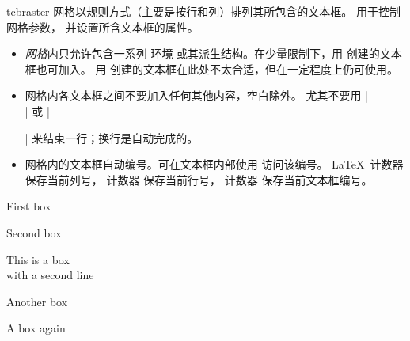 \begin{docEnvironment}[doc new and updated={2014-11-10}{2017-02-01}]{tcbraster}{}
网格以规则方式（主要是按行和列）排列其所包含的文本框。
 用于控制网格参数，
并设置所含文本框的属性。
\begin{itemize}
\item \emph{网格}内只允许包含一系列  环境
  或其派生结构。在少量限制下，用  创建的文本框也可加入。
  用  创建的文本框在此处不太合适，但在一定程度上仍可使用。
\item 网格内各文本框之间不要加入任何其他内容，空白除外。
  尤其不要用 |\\| 或 |\par| 来结束一行；换行是自动完成的。
\item 网格内的文本框自动编号。可在文本框内部使用
   访问该编号。
  \LaTeX\ 计数器  保存当前列号，
  计数器  保存当前行号，
  计数器  保存当前文本框编号。
\end{itemize}

\enlargethispage*{1cm}

\begin{dispExample}
\begin{tcbraster}[raster columns=3, raster equal height,
  size=small,colframe=red!50!black,colback=red!10!white,colbacktitle=red!50!white,
  title={Box \# \thetcbrasternum}]
  \begin{tcolorbox}First box\end{tcolorbox}
  \begin{tcolorbox}Second box\end{tcolorbox}
  \begin{tcolorbox}This is a box\\with a second line\end{tcolorbox}
  \begin{tcolorbox}Another box\end{tcolorbox}
  \begin{tcolorbox}A box again\end{tcolorbox}
\end{tcbraster}
\end{dispExample}


\end{docEnvironment}
